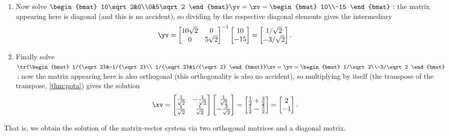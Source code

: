 \begin{example}
\begin{solution}
\begin{enumerate}
\item Now solve \(\begin{bmat} 10\sqrt2&0\\0&5\sqrt2 \end{bmat}\yv=\zv=\begin{bmat} 10\\-15 \end{bmat}\)\,:  the matrix appearing here is diagonal (and this is no accident), so dividing by the respective diagonal elements gives the intermediary
\begin{equation*}
\yv=\begin{bmatrix} 10\sqrt2&0\\0&5\sqrt2 \end{bmatrix}^{-1}
\begin{bmatrix} 10\\-15 \end{bmatrix}
=\begin{bmatrix} 1/\sqrt2\\-3/\sqrt2 \end{bmatrix}.
\end{equation*}

\item Finally solve \(\tr{\begin{bmat} 1/{\sqrt2}&-1/{\sqrt2}\\ 1/{\sqrt2}&1/{\sqrt2} \end{bmat}}\xv=\yv=\begin{bmat} 1/\sqrt2\\-3/\sqrt2 \end{bmat}\)\,: now the matrix appearing here is also orthogonal (this orthogonality is also no accident), so multiplying by itself (the transpose of the transpose, \cref{thm:pota}) gives the solution
\begin{equation*}
\xv=\begin{bmatrix} \frac1{\sqrt2}&-\frac1{\sqrt2}\\ \frac1{\sqrt2}&\frac1{\sqrt2} \end{bmatrix}
\begin{bmatrix} \frac1{\sqrt2}\\-\frac3{\sqrt2} \end{bmatrix}
=\begin{bmatrix} \frac12+\frac32\\\frac12-\frac32 \end{bmatrix}
=\begin{bmatrix} 2\\-1 \end{bmatrix}.
\end{equation*}

\end{enumerate}
That is, we obtain the solution of the matrix-vector system via two orthogonal matrices and a diagonal matrix.
\end{solution}
\end{example}





